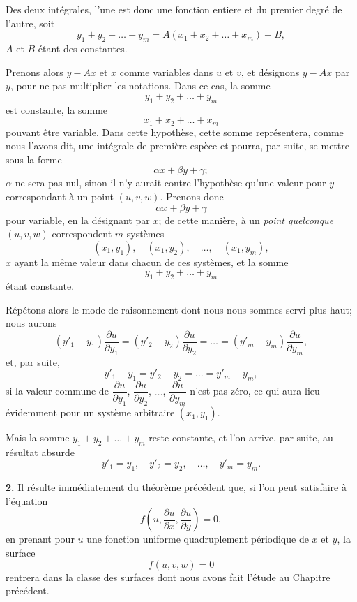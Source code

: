 \documentclass{article}
\begin{document}
Des deux intégrales, l'une est donc une fonction entiere et du premier degré de l'autre, soit
\[
y_{1} + y_{2} + \ldots + y_{m} = A(x_{1} + x_{2} + \ldots + x_{m}) + B,
\]
$A$ et $B$ étant des constantes.

Prenons alors $y - Ax$ et $x$ comme variables dans $u$ et $v$, et désignons $y - Ax$ par $y$, pour ne pas multiplier les notations. Dans ce cas, la somme
\[
y_{1} + y_{2} + \ldots + y_{m}
\]
est constante, la somme
\[
x_{1} + x_{2} + \ldots + x_{m}
\]
pouvant être variable. Dans cette hypothèse, cette somme représentera, comme nous l'avons dit, une intégrale de première espèce et pourra, par suite, se mettre sous la forme
\[
\alpha x + \beta y + \gamma;
\]
$\alpha$ ne sera pas nul, sinon il n'y aurait contre l'hypothèse qu'une valeur pour $y$ correspondant à un point $(u, v, w)$. Prenons donc
\[
\alpha x + \beta y + \gamma
\]
pour variable, en la désignant par $x$; de cette manière, à un \emph{point quelconque} $(u, v, w)$ correspondent $m$ systèmes
\[
(x_{1}, y_{1}), \quad (x_{1}, y_{2}), \quad \ldots, \quad (x_{1}, y_{m}),
\]
$x$ ayant la même valeur dans chacun de ces systèmes, et la somme
\[
y_{1} + y_{2} + \ldots + y_{m}
\]
étant constante.

Répétons alors le mode de raisonnement dont nous nous sommes servi plus haut; nous aurons
\[
(y'_{1} - y_{1})\frac{\partial u}{\partial y_{1}} = (y'_{2} - y_{2})\frac{\partial u}{\partial y_{2}} = \ldots = (y'_{m} - y_{m})\frac{\partial u}{\partial y_{m}},
\]
et, par suite,
\[
y'_{1} - y_{1} = y'_{2} - y_{2} = \ldots = y'_{m} - y_{m},
\]
si la valeur commune de $\dfrac{\partial u}{\partial y_{1}}$, $\dfrac{\partial u}{\partial y_{2}}$, $\ldots$, $\dfrac{\partial u}{\partial y_{m}}$ n'est pas zéro, ce qui aura lieu évidemment pour un système arbitraire $(x_{1}, y_{1})$.

Mais la somme $y_{1} + y_{2} + \ldots + y_{m}$ reste constante, et l'on arrive, par suite, au résultat absurde
\[
y'_{1} = y_{1}, \quad y'_{2} = y_{2}, \quad \ldots, \quad y'_{m} = y_{m}.
\]


\textbf{2.} Il résulte immédiatement du théorème précédent que, si l'on peut satisfaire à l'équation
\[
f\left( u, \frac{\partial u}{\partial x}, \frac{\partial u}{\partial y} \right) = 0,
\]
en prenant pour $u$ une fonction uniforme quadruplement périodique de $x$ et $y$, la surface
\[
f(u, v, w) = 0
\]
rentrera dans la classe des surfaces dont nous avons fait l'étude au Chapitre précédent.
\end{document}

